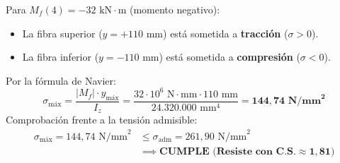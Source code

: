Para $M_f(4) = -32\text{ kN}\cdot\text{m}$ (momento negativo):
\begin{itemize}
    \item La fibra superior ($y = +110\text{ mm}$) está sometida a \textbf{tracción} ($\sigma > 0$).
    \item La fibra inferior ($y = -110\text{ mm}$) está sometida a \textbf{compresión} ($\sigma < 0$).
\end{itemize}
Por la fórmula de Navier:
\begin{equation}
    \sigma_{\text{máx}} = \frac{|M_f| \cdot y_{\text{máx}}}{I_z} = \frac{32 \cdot 10^6\text{ N}\cdot\text{mm} \cdot 110\text{ mm}}{24.320.000\text{ mm}^4} = \mathbf{144{,}74\text{ N/mm}^2}
\end{equation}
Comprobación frente a la tensión admisible:
\begin{align}
    \sigma_{\text{máx}} = 144{,}74\text{ N/mm}^2 & \le \sigma_{\text{adm}} = 261{,}90\text{ N/mm}^2 \nonumber \\
    & \implies \mathbf{CUMPLE\text{ (Resiste con } \text{C.S.} \approx 1{,}81)}
\end{align}

